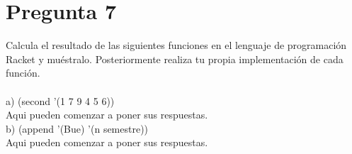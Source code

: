 \newpage
\section*{Pregunta 7}
\Large 
Calcula el resultado de las siguientes funciones en el lenguaje de programación Racket y muéstralo. Posteriormente realiza tu propia implementación de cada función.\\\\
a) (second '(1 7 9 4 5 6))\\
\newline
\large
Aqui pueden comenzar a poner sus respuestas.\\
\newline
\Large
b) (append ’(Bue) ’(n semestre))\\
\newline
\large
Aqui pueden comenzar a poner sus respuestas.